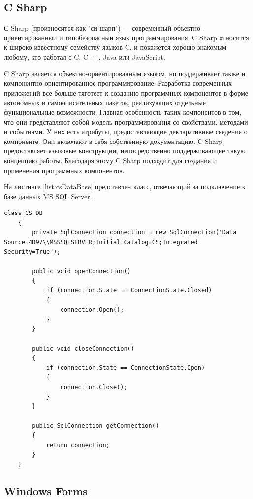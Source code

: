 \subsection{C Sharp}

\vspace{0.5cm}
\hspace{0.6cm}
С Sharp (произносится как "си шарп") — современный объектно-ориентированный и типобезопасный язык программирования. C Sharp относится к широко известному семейству языков C, и покажется хорошо знакомым любому, кто работал с C, C++, Java или JavaScript.

\vspace{0.1cm}
C Sharp является объектно-ориентированным языком, но поддерживает также и компонентно-ориентированное программирование. Разработка современных приложений все больше тяготеет к созданию программных компонентов в форме автономных и самоописательных пакетов, реализующих отдельные функциональные возможности. Главная особенность таких компонентов в том, что они представляют собой модель программирования со свойствами, методами и событиями. У них есть атрибуты, предоставляющие декларативные сведения о компоненте. Они включают в себя собственную документацию. C Sharp предоставляет языковые конструкции, непосредственно поддерживающие такую концепцию работы. Благодаря этому C Sharp подходит для создания и применения программных компонентов\cite{microsoft-csharp}.

\vspace{0.1cm}
На листинге \ref{list:csDataBase} представлен класс, отвечающий за подключение к базе данных MS SQL Server.

\begin{lstlisting}[caption=Подключение к базе данных, label = list:csDataBase]
	class CS_DB
	{
		private SqlConnection connection = new SqlConnection("Data Source=4D97\\MSSSQLSERVER;Initial Catalog=CS;Integrated Security=True");
	
		public void openConnection()
		{
			if (connection.State == ConnectionState.Closed)
			{
				connection.Open();
			}    
		}
	
		public void closeConnection()
		{
			if (connection.State == ConnectionState.Open)
			{
				connection.Close();
			}
		}
	
		public SqlConnection getConnection()
		{
			return connection;
		}
	}
\end{lstlisting}

\subsection{Windows Forms}

